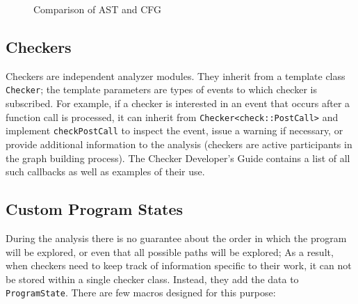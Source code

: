 \begin{figure}[H]
	\centering
	\hspace{30pt}
	\caption{Comparison of AST and CFG}
	\label{fig:ast-and-cfg}
\end{figure}

\subsection{Checkers}
Checkers are independent analyzer modules. They inherit from a template class \lstinline{Checker}; the template parameters are types of events to which checker is subscribed. For example, if a checker is interested in an event that occurs after a function call is processed, it can inherit from \lstinline{Checker<check::PostCall>} and implement \lstinline{checkPostCall} to inspect the event, issue a warning if necessary, or provide additional information to the analysis (checkers are active participants in the graph building process). The Checker Developer's Guide \cite{noqa} contains a list of all such callbacks as well as examples of their use. 

\subsection{Custom Program States} \label{checker-states}
During the analysis there is no guarantee about the order in which the program will be explored, or even that all possible paths will be explored; As a result, when checkers need to keep track of information specific to their work, it can not be stored within a single checker class. Instead, they add the data to \lstinline{ProgramState}. There are few macros designed for this purpose:


